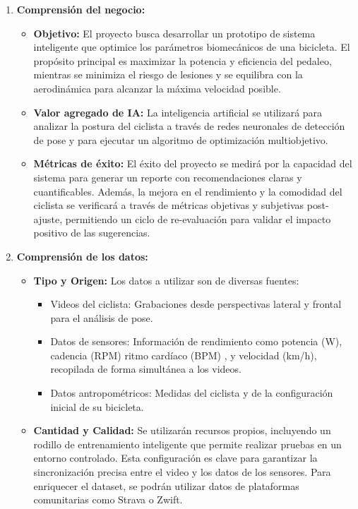 \documentclass[
11pt, %
]{charter}
\begin{document}
\begin{enumerate}
  \item \textbf{Comprensión del negocio:}
    \begin{itemize}
      \item \textbf{Objetivo:} El proyecto busca desarrollar un prototipo de sistema inteligente que optimice los parámetros biomecánicos de una bicicleta. El propósito principal es maximizar la potencia y eficiencia del pedaleo, mientras se minimiza el riesgo de lesiones y se equilibra con la aerodinámica para alcanzar la máxima velocidad posible.
      \item \textbf{Valor agregado de IA:} La inteligencia artificial se utilizará para analizar la postura del ciclista a través de redes neuronales de detección de pose y para ejecutar un algoritmo de optimización multiobjetivo.
      \item \textbf{Métricas de éxito:}  El éxito del proyecto se medirá por la capacidad del sistema para generar un reporte con recomendaciones claras y cuantificables. Además, la mejora en el rendimiento y la comodidad del ciclista se verificará a través de métricas objetivas y subjetivas post-ajuste, permitiendo un ciclo de re-evaluación para validar el impacto positivo de las sugerencias.
    \end{itemize}

  \item \textbf{Comprensión de los datos:}
    \begin{itemize}
      \item \textbf{Tipo y Origen:} Los datos a utilizar son de diversas fuentes:
        \begin{itemize}
          \item Videos del ciclista: Grabaciones desde perspectivas lateral y frontal para el análisis de pose.
          \item Datos de sensores: Información de rendimiento como potencia (W), cadencia (RPM) ritmo cardíaco (BPM) , y velocidad (km/h), recopilada de forma simultánea a los videos.
          \item Datos antropométricos: Medidas del ciclista y de la configuración inicial de su bicicleta.
        \end{itemize}
      \item \textbf{Cantidad y Calidad:} Se utilizarán recursos propios, incluyendo un rodillo de entrenamiento inteligente que permite realizar pruebas en un entorno controlado. Esta configuración es clave para garantizar la sincronización precisa entre el video y los datos de los sensores. Para enriquecer el dataset, se podrán utilizar datos de plataformas comunitarias como Strava o Zwift.
    \end{itemize}


\end{enumerate}
\end{document}
